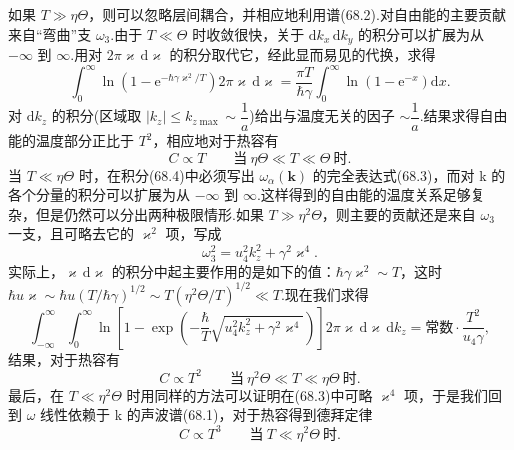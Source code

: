 如果 $T\gg\eta\Theta$，则可以忽略层间耦合，并相应地利用谱(68.2).对自由能的主要贡献来自“弯曲”支 $\omega_3$.由于 $T\ll\Theta$ 时收敛很快，关于 $\mathrm{d}k_x\,\mathrm{d}k_y$ 的积分可以扩展为从 $-\infty$ 到 $\infty$.用对 $2\pi\varkappa\,\mathrm{d}\varkappa$ 的积分取代它，经此显而易见的代换，求得
\begin{equation*}
  \int_0^{\infty}\ln\left(1-\mathrm{e}^{-\hbar\gamma\varkappa^2/T}\right)2\pi\varkappa\,\mathrm{d}\varkappa
  =\frac{\pi T}{\hbar\gamma}\int_0^{\infty}\ln\left(1-\mathrm{e}^{-x}\right)\mathrm{d}x.
\end{equation*}
对 $\mathrm{d}k_z$ 的积分(区域取 $|k_z|\leqslant k_{z\max}\sim\dfrac{1}{a}$)给出与温度无关的因子 $\sim\dfrac{1}{a}$.结果求得自由能的温度部分正比于 $T^2$，相应地对于热容有
\begin{equation}
  C\propto T\qquad\text{当}\ \eta\Theta\ll T\ll\Theta\ \text{时}.
\end{equation}
当 $T\ll\eta\Theta$ 时，在积分(68.4)中必须写出 $\omega_\alpha(\boldsymbol{k})$ 的完全表达式(68.3)，而对 k 的各个分量的积分可以扩展为从 $-\infty$ 到 $\infty$.这样得到的自由能的温度关系足够复杂，但是仍然可以分出两种极限情形.如果 $T\gg\eta^2\Theta$，则主要的贡献还是来自 $\omega_3$ 一支，且可略去它的 $\varkappa^2$ 项，写成
\begin{equation*}
  \omega_3^2=u_4^2k_z^2+\gamma^2\varkappa^4.
\end{equation*}
实际上，$\varkappa\,\mathrm{d}\varkappa$ 的积分中起主要作用的是如下的值：$\hbar\gamma\varkappa^2\sim T$，这时 $\hbar u\varkappa\sim\hbar u\left(T/\hbar\gamma\right)^{1/2}\sim T\left(\eta^2\Theta/T\right)^{1/2}\ll T$.现在我们求得
\begin{equation*}
  \int_{-\infty}^{\infty}\int_0^{\infty}\ln\left[1-\exp\left(-\frac{\hbar}{T}\sqrt{u_4^2k_z^2+\gamma^2\varkappa^4}\right)\right]2\pi\varkappa\,\mathrm{d}\varkappa\,\mathrm{d}k_z
  =\text{常数}\cdot\frac{T^2}{u_4\gamma},
\end{equation*}
结果，对于热容有
\begin{equation}
  C\propto T^2\qquad\text{当}\ \eta^2\Theta\ll T\ll\eta\Theta\ \text{时}.
\end{equation}
最后，在 $T\ll\eta^2\Theta$ 时用同样的方法可以证明在(68.3)中可略 $\varkappa^4$ 项，于是我们回到 $\omega$ 线性依赖于 k 的声波谱(68.1)，对于热容得到德拜定律
\begin{equation}
  C\propto T^3\qquad\text{当}\ T\ll\eta^2\Theta\ \text{时}.
\end{equation}

